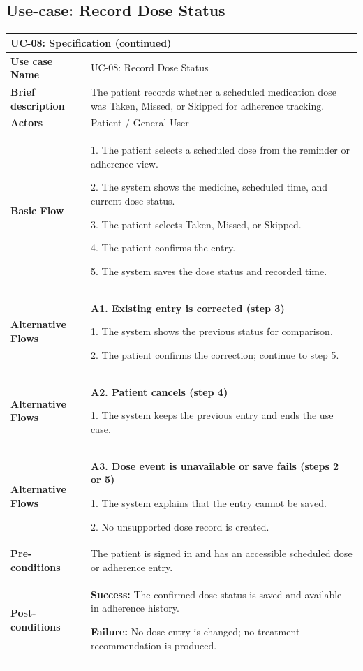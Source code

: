 \subsection{Use-case: Record Dose Status}
\label{uc:uc-08}
\begin{longtable}{|p{}|p{}|}
\hline
\endfirsthead
\multicolumn{2}{l}{\textbf{UC-08: Specification (continued)}} \\
\hline
\endhead
\textbf{Use case Name} & UC-08: Record Dose Status \\ \hline
\textbf{Brief description} & The patient records whether a scheduled medication dose was Taken, Missed, or Skipped for adherence tracking. \\ \hline
\textbf{Actors} & Patient / General User \\ \hline
\textbf{Basic Flow} &
1. The patient selects a scheduled dose from the reminder or adherence view.\par
2. The system shows the medicine, scheduled time, and current dose status.\par
3. The patient selects Taken, Missed, or Skipped.\par
4. The patient confirms the entry.\par
5. The system saves the dose status and recorded time.
\\ \hline
\textbf{Alternative Flows} &
\textbf{A1. Existing entry is corrected (step 3)}\par
1. The system shows the previous status for comparison.\par
2. The patient confirms the correction; continue to step 5.
\\ \hline
\textbf{Alternative Flows} &
\textbf{A2. Patient cancels (step 4)}\par
1. The system keeps the previous entry and ends the use case.
\\ \hline
\textbf{Alternative Flows} &
\textbf{A3. Dose event is unavailable or save fails (steps 2 or 5)}\par
1. The system explains that the entry cannot be saved.\par
2. No unsupported dose record is created.
\\ \hline
\textbf{Pre-conditions} & The patient is signed in and has an accessible scheduled dose or adherence entry. \\ \hline
\textbf{Post-conditions} & \textbf{Success:} The confirmed dose status is saved and available in adherence history.\par
\textbf{Failure:} No dose entry is changed; no treatment recommendation is produced. \\ \hline
\end{longtable}
\clearpage
